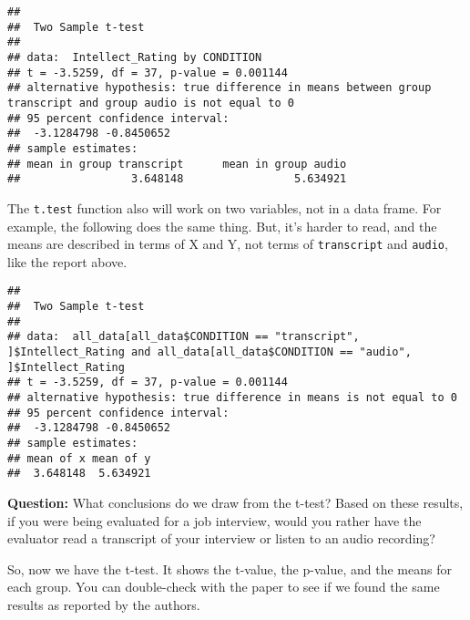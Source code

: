 \documentclass[
]{book}
\newenvironment{Shaded}{\begin{snugshade}}{\end{snugshade}}
\newcommand{\AttributeTok}[1]{\textcolor[rgb]{0.13,0.29,0.53}{#1}}
\newcommand{\FunctionTok}[1]{\textcolor[rgb]{0.13,0.29,0.53}{\textbf{#1}}}
\newcommand{\NormalTok}[1]{#1}
\newcommand{\SpecialCharTok}[1]{\textcolor[rgb]{0.81,0.36,0.00}{\textbf{#1}}}
\newcommand{\StringTok}[1]{\textcolor[rgb]{0.31,0.60,0.02}{#1}}
\begin{document}
\begin{verbatim}
## 
##  Two Sample t-test
## 
## data:  Intellect_Rating by CONDITION
## t = -3.5259, df = 37, p-value = 0.001144
## alternative hypothesis: true difference in means between group transcript and group audio is not equal to 0
## 95 percent confidence interval:
##  -3.1284798 -0.8450652
## sample estimates:
## mean in group transcript      mean in group audio 
##                 3.648148                 5.634921
\end{verbatim}

The \texttt{t.test} function also will work on two variables, not in a data frame. For example, the following does the same thing. But, it's harder to read, and the means are described in terms of X and Y, not terms of \texttt{transcript} and \texttt{audio}, like the report above.

\begin{Shaded}
\end{Shaded}

\begin{verbatim}
## 
##  Two Sample t-test
## 
## data:  all_data[all_data$CONDITION == "transcript", ]$Intellect_Rating and all_data[all_data$CONDITION == "audio", ]$Intellect_Rating
## t = -3.5259, df = 37, p-value = 0.001144
## alternative hypothesis: true difference in means is not equal to 0
## 95 percent confidence interval:
##  -3.1284798 -0.8450652
## sample estimates:
## mean of x mean of y 
##  3.648148  5.634921
\end{verbatim}

\textbf{Question:} What conclusions do we draw from the t-test? Based on these results, if you were being evaluated for a job interview, would you rather have the evaluator read a transcript of your interview or listen to an audio recording?

So, now we have the t-test. It shows the t-value, the p-value, and the means for each group. You can double-check with the paper to see if we found the same results as reported by the authors.
\end{document}
